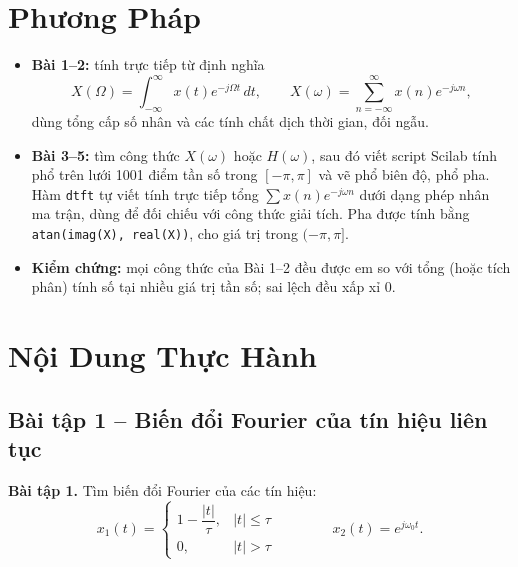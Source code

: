 \documentclass[12pt,a4paper]{article}
\begin{document}
\section{Phương Pháp}
\begin{itemize}
    \item \textbf{Bài 1--2:} tính trực tiếp từ định nghĩa
    \[
        X(\Omega) = \int_{-\infty}^{\infty} x(t) e^{-j\Omega t}\, dt,
        \qquad
        X(\omega) = \sum_{n=-\infty}^{\infty} x(n) e^{-j\omega n},
    \]
    dùng tổng cấp số nhân và các tính chất dịch thời gian, đối ngẫu.
    \item \textbf{Bài 3--5:} tìm công thức $X(\omega)$ hoặc $H(\omega)$, sau đó viết script Scilab tính phổ trên lưới 1001 điểm tần số trong $[-\pi, \pi]$ và vẽ phổ biên độ, phổ pha. Hàm \texttt{dtft} tự viết tính trực tiếp tổng $\sum x(n) e^{-j\omega n}$ dưới dạng phép nhân ma trận, dùng để đối chiếu với công thức giải tích. Pha được tính bằng \texttt{atan(imag(X), real(X))}, cho giá trị trong $(-\pi, \pi]$.
    \item \textbf{Kiểm chứng:} mọi công thức của Bài 1--2 đều được em so với tổng (hoặc tích phân) tính số tại nhiều giá trị tần số; sai lệch đều xấp xỉ 0.
\end{itemize}

\section{Nội Dung Thực Hành}

\subsection{Bài tập 1 -- Biến đổi Fourier của tín hiệu liên tục}
\begin{mdframed}[style=exbox]
\noindent\textbf{Bài tập 1.} Tìm biến đổi Fourier của các tín hiệu:
\[
    x_1(t) =
    \begin{cases}
        1 - \dfrac{|t|}{\tau}, & |t| \le \tau \\[1ex]
        0, & |t| > \tau
    \end{cases}
    \qquad\qquad
    x_2(t) = e^{j\omega_0 t}.
\]
\end{mdframed}
\end{document}
